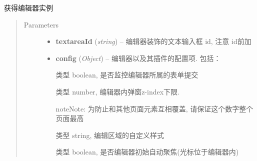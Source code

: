 \documentclass[letterpaper,10pt,english]{sphinxmanual}
\begin{document}
\begin{fulllineitems}
\label{relatedproj/editorguide/usage:Editor.KISSY.Editor}
获得编辑器实例
\begin{quote}\begin{description}
\item[{Parameters}] \leavevmode\begin{itemize}
\item {}
\textbf{textareaId} (\emph{string}) -- 编辑器装饰的文本输入框 id, 注意 id前加 \code{\#}

\item {}
\textbf{config} (\emph{Object}) --
编辑器以及其插件的配置项. 包括：


\begin{fulllineitems}
\label{relatedproj/editorguide/usage:Editor.KISSY.Editor.config.attachForm}
类型 boolean,  是否监控编辑器所属的表单提交

\end{fulllineitems}



\begin{fulllineitems}
\label{relatedproj/editorguide/usage:Editor.KISSY.Editor.config.baseZIndex}
类型 number, 编辑器内弹窗z-index下限.

\begin{notice}{note}{Note:}
为防止和其他页面元素互相覆盖, 请保证这个数字整个页面最高
\end{notice}

\end{fulllineitems}



\begin{fulllineitems}
\label{relatedproj/editorguide/usage:Editor.KISSY.Editor.config.customStyle}
类型 string, 编辑区域的自定义样式

\end{fulllineitems}



\begin{fulllineitems}
\label{relatedproj/editorguide/usage:Editor.KISSY.Editor.config.focus}
类型 boolean, 是否编辑器初始自动聚焦(光标位于编辑器内)


\end{fulllineitems}
\end{itemize}
\end{description}
\end{quote}
\end{fulllineitems}
\end{document}
